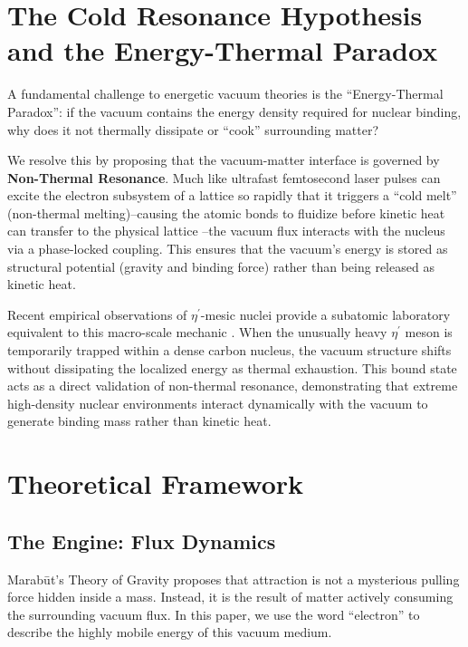 \documentclass[11pt, a4paper]{article}
\begin{document}
\section{The Cold Resonance Hypothesis and the Energy-Thermal Paradox}
  A fundamental challenge to energetic vacuum theories is the ``Energy-Thermal Paradox'': if the vacuum contains the energy density required for nuclear binding, why does it not thermally dissipate or ``cook'' surrounding matter?

  We resolve this by proposing that the vacuum-matter interface is governed by \textbf{Non-Thermal Resonance}. Much like ultrafast femtosecond laser pulses can excite the electron subsystem of a lattice so rapidly that it triggers a ``cold melt'' (non-thermal melting)--causing the atomic bonds to fluidize before kinetic heat can transfer to the physical lattice \cite{rousse2001}--the vacuum flux interacts with the nucleus via a phase-locked coupling. This ensures that the vacuum's energy is stored as structural potential (gravity and binding force) rather than being released as kinetic heat.

  Recent empirical observations of $\eta^{\prime}$-mesic nuclei provide a subatomic laboratory equivalent to this macro-scale mechanic \cite{mesic2026}. When the unusually heavy $\eta^{\prime}$ meson is temporarily trapped within a dense carbon nucleus, the vacuum structure shifts without dissipating the localized energy as thermal exhaustion. This bound state acts as a direct validation of non-thermal resonance, demonstrating that extreme high-density nuclear environments interact dynamically with the vacuum to generate binding mass rather than kinetic heat.

\section{Theoretical Framework}

\subsection{The Engine: Flux Dynamics}
  Marab\={u}t's Theory of Gravity proposes that attraction is not a mysterious pulling force hidden inside a mass. Instead, it is the result of matter actively consuming the surrounding vacuum flux. In this paper, we use the word ``electron'' to describe the highly mobile energy of this vacuum medium. 
  
\end{document}
